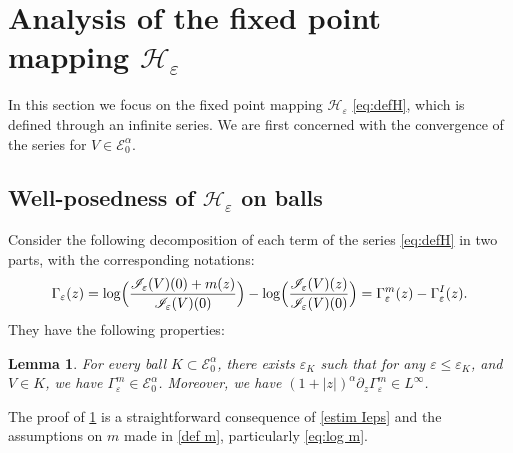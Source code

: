 \documentclass[10pt]{amsart}
\let\mathcal\mathscr
\newcommand{\cI}{\mathcal{I}}
\theoremstyle{plain}
\newtheorem{lem}[thm]{Lemma}
\theoremstyle{definition}
\renewcommand{\H}{\mathcal{H}_\eps}
\let\eps\varepsilon
\newcommand{\Eaz}{\mathcal{E}^\alpha_0}
\newcommand{\Gammam}{\Gamma^m_{\eps}}
\newcommand{\GammaI}{\Gamma^I_{\eps}}
\begin{document}
\section{Analysis of the fixed point mapping \texorpdfstring{$\H$}{He}}\label{sec properties H}
In this section we focus on the fixed point mapping $\H$ \eqref{eq:defH}, which is defined through an infinite series.
We are first concerned with the convergence of the series for $V\in \Eaz$.
\subsection{Well-posedness of $\H$ on balls}\label{sec finiteness H}
Consider the following decomposition of each term of the series \eqref{eq:defH} in two parts, with the corresponding notations:
\begin{equation*}
\Gamma_\eps(z) = \log \Bigl(\dfrac{\cI_\eps(V)(0)+m(z)}{\cI_\eps(V)(0)} \Bigr) - \log \Bigl(\dfrac{\cI_\eps(V)(z)}{\cI_\eps(V)(0)} \Bigr) = \Gammam(z)- \GammaI(z).
\end{equation*}
They have the following properties:

\begin{lem}\label{cond log Ieps+m Eaz}
For every ball $K\subset \Eaz$, there exists $\eps_K$ such that for any $\eps \leq \eps_K$, and $V\in K$, we have $\Gammam \in \Eaz$. Moreover, we have $(1+|z|)^\alpha\partial_z \Gammam \in L^\infty$.
\end{lem}
The proof of \cref{cond log Ieps+m Eaz} is a straightforward consequence of \cref{estim Ieps} and the assumptions on $m$ made in \cref{def m}, particularly \eqref{eq:log m}.
\end{document}
